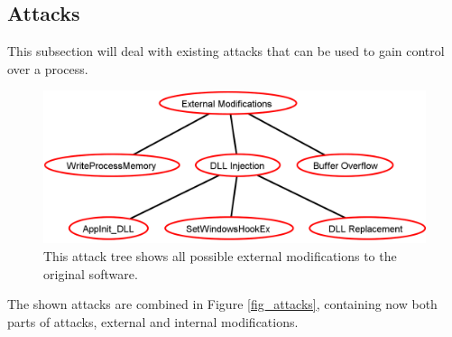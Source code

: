 \subsection{Attacks}
This subsection will deal with existing attacks that can be used to gain control over a process.
\begin{figure}[h]
\centering
\includegraphics[scale=0.35]{sections/adtrees/ExternalModificationsWithoutDefenses.png}
\caption{This attack tree shows all possible external modifications to the original software.}
\label{fig:attacks_external}
\end{figure}




The shown attacks are combined in Figure \ref{fig_attacks}, containing now both parts of attacks, external and internal modifications.
